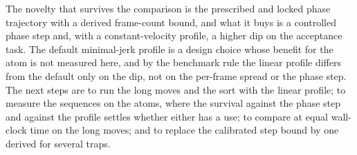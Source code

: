 The novelty that survives the comparison is the prescribed and locked phase trajectory with a derived frame-count bound, and what it buys is a controlled phase step and, with a constant-velocity profile, a higher dip on the acceptance task. The default minimal-jerk profile is a design choice whose benefit for the atom is not measured here, and by the benchmark rule the linear profile differs from the default only on the dip, not on the per-frame spread or the phase step. The next steps are to run the long moves and the sort with the linear profile; to measure the sequences on the atoms, where the survival against the phase step and against the profile settles whether either has a use; to compare at equal wall-clock time on the long moves; and to replace the calibrated step bound by one derived for several traps.
